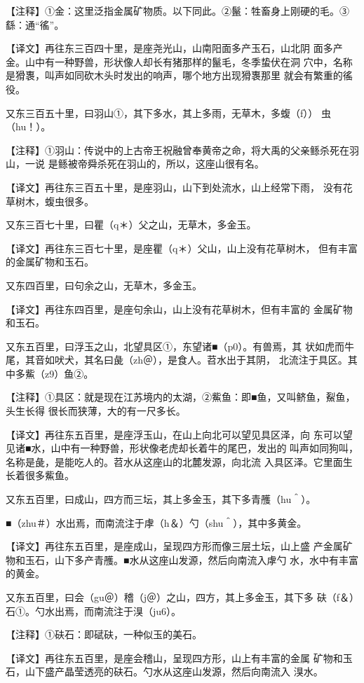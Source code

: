 \documentclass[a4paper,12pt,UTF8,twoside]{ctexbook}
\begin{document}
【注释】①金：这里泛指金属矿物质。以下同此。②鬣：牲畜身上刚硬的毛。③繇：通“徭”。

【译文】再往东三百四十里，是座尧光山，山南阳面多产玉石，山北阴 面多产金。山中有一种野兽，形状像人却长有猪那样的鬣毛，冬季蛰伏在洞 穴中，名称是猾褢，叫声如同砍木头时发出的响声，哪个地方出现猾褢那里 就会有繁重的徭役。

又东三百五十里，曰羽山①，其下多水，其上多雨，无草木，多蝮（f）） 虫（hu！）。

【注释】①羽山：传说中的上古帝王祝融曾奉黄帝之命，将大禹的父亲鲧杀死在羽山，一说 是鲧被帝舜杀死在羽山的，所以，这座山很有名。

【译文】再往东三百五十里，是座羽山，山下到处流水，山上经常下雨， 没有花草树木，蝮虫很多。

又东三百七十里，曰瞿（q＊）父之山，无草木，多金玉。

【译文】再往东三百七十里，是座瞿（q＊）父山，山上没有花草树木， 但有丰富的金属矿物和玉石。

又东四百里，曰句余之山，无草木，多金玉。

【译文】再往东四百里，是座句余山，山上没有花草树木，但有丰富的 金属矿物和玉石。

又东五百里，曰浮玉之山，北望具区①，东望诸■（p0）。有兽焉，其 状如虎而牛尾，其音如吠犬，其名曰彘（zh＠），是食人。苕水出于其阴， 北流注于具区。其中多鮆（z9）鱼②。

【注释】①具区：就是现在江苏境内的太湖，②鮆鱼：即■鱼，又叫鲚鱼，鮤鱼，头生长得 很长而狭薄，大的有一尺多长。

【译文】再往东五百里，是座浮玉山，在山上向北可以望见具区泽，向 东可以望见诸■水，山中有一种野兽，形状像老虎却长着牛的尾巴，发出的 叫声如同狗叫，名称是彘，是能吃人的。苕水从这座山的北麓发源，向北流 入具区泽。它里面生长着很多鮆鱼。

又东五百里，曰成山，四方而三坛，其上多金玉，其下多青雘（hu＾）。

■（zhu＃）水出焉，而南流注于虖（h＆）勺（shu＾），其中多黄金。

【译文】再往东五百里，是座成山，呈现四方形而像三层土坛，山上盛 产金属矿物和玉石，山下多产青雘。■水从这座山发源，然后向南流入虖勺 水，水中有丰富的黄金。

又东五百里，曰会（gu＠）稽（j＠）之山，四方，其上多金玉，其下多 砆（f＆）石①。勺水出焉，而南流注于湨（ju6）。

【注释】①砆石：即碔砆，一种似玉的美石。

【译文】再往东五百里，是座会稽山，呈现四方形，山上有丰富的金属 矿物和玉石，山下盛产晶莹透亮的砆石。勺水从这座山发源，然后向南流入 湨水。
\end{document}
